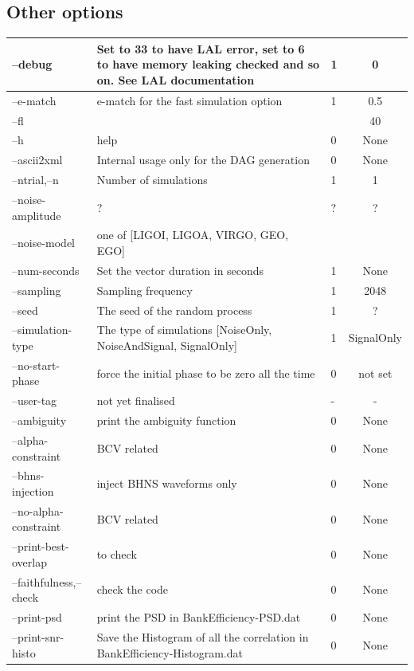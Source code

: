 \documentclass[a4paper,10pt]{article}
\begin{document}
\begin{center}
\begin{tabular}{|l|p{8cm}|p{3cm}|c|}
\end{tabular}
\end{center}

\subsection{Other options}

\begin{center}
\begin{tabular}{|l|p{8cm}|p{3cm}|c|}
\hline
--debug &Set to 33 to have LAL error, set to 6 to have memory leaking checked and so on. See LAL documentation &1&0\\\hline
--e-match  &e-match for the fast simulation option&1&0.5\\\hline
--fl &&&40\\\hline
--h &help&0&None\\\hline
--ascii2xml &Internal usage only for the DAG generation&0&None\\\hline
--ntrial,--n  &Number of simulations&1&1\\\hline
--noise-amplitude &?&?&?\\\hline
--noise-model &one of [LIGOI, LIGOA, VIRGO, GEO, EGO]&&\\\hline
--num-seconds &Set the vector duration in seconds&1&None\\\hline
--sampling &Sampling frequency&1&2048\\\hline
--seed &The seed of the random process&1&?\\\hline
--simulation-type &The type of simulations [NoiseOnly, NoiseAndSignal, SignalOnly]&1&SignalOnly\\\hline
--no-start-phase &force the initial phase to be zero all the time&0& not set\\\hline
--user-tag &not yet finalised&-&-\\\hline
--ambiguity &print the ambiguity function&0&None\\\hline
--alpha-constraint &BCV related&0&None\\\hline
--bhns-injection &inject BHNS waveforms only&0&None\\\hline
--no-alpha-constraint &BCV related&0&None\\\hline
--print-best-overlap &to check &0&None\\\hline
--faithfulness,--check &check the code&0&None\\\hline
--print-psd &print the PSD in BankEfficiency-PSD.dat&0&None\\\hline
--print-snr-histo &Save the Histogram of all the correlation in BankEfficiency-Histogram.dat&0&None\\\hline

\end{tabular}
\end{center}
\end{document}
